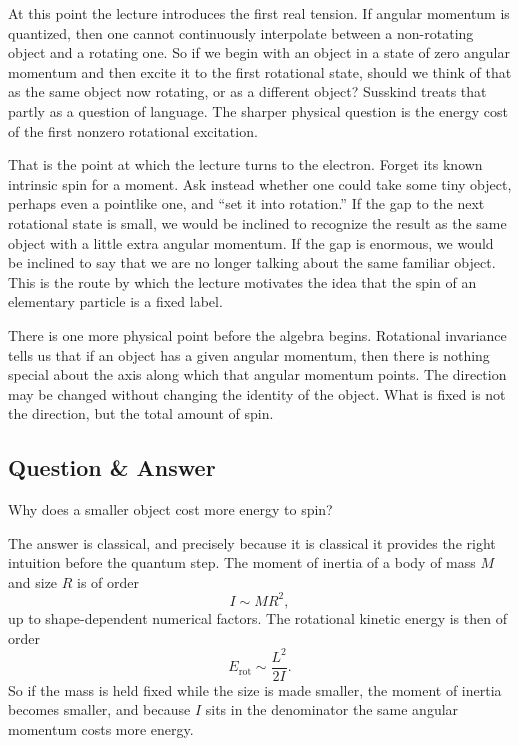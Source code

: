 At this point the lecture introduces the first real tension. If angular momentum is quantized, then one cannot continuously interpolate between a non-rotating object and a rotating one. So if we begin with an object in a state of zero angular momentum and then excite it to the first rotational state, should we think of that as the same object now rotating, or as a different object? Susskind treats that partly as a question of language. The sharper physical question is the energy cost of the first nonzero rotational excitation.

That is the point at which the lecture turns to the electron. Forget its known intrinsic spin for a moment. Ask instead whether one could take some tiny object, perhaps even a pointlike one, and ``set it into rotation.'' If the gap to the next rotational state is small, we would be inclined to recognize the result as the same object with a little extra angular momentum. If the gap is enormous, we would be inclined to say that we are no longer talking about the same familiar object. This is the route by which the lecture motivates the idea that the spin of an elementary particle is a fixed label.

There is one more physical point before the algebra begins. Rotational invariance tells us that if an object has a given angular momentum, then there is nothing special about the axis along which that angular momentum points. The direction may be changed without changing the identity of the object. What is fixed is not the direction, but the total amount of spin.

\subsection{Question \& Answer}

Why does a smaller object cost more energy to spin?

The answer is classical, and precisely because it is classical it provides the right intuition before the quantum step. The moment of inertia of a body of mass \(M\) and size \(R\) is of order
\begin{equation}
I\sim MR^2,
\end{equation}
up to shape-dependent numerical factors. The rotational kinetic energy is then of order
\begin{equation}
E_{\mathrm{rot}}\sim \frac{L^2}{2I}.
\end{equation}
So if the mass is held fixed while the size is made smaller, the moment of inertia becomes smaller, and because \(I\) sits in the denominator the same angular momentum costs more energy.

